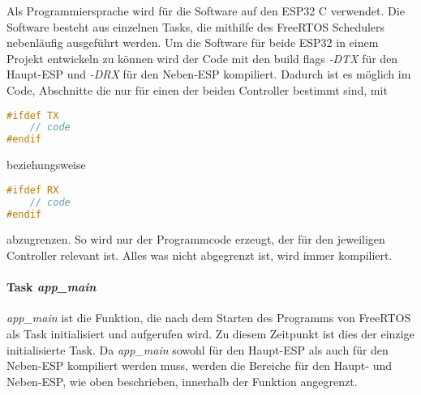 Als Programmiersprache wird für die Software auf den ESP32 C verwendet.
Die Software besteht aus einzelnen Tasks, die mithilfe des FreeRTOS Schedulers nebenläufig ausgeführt werden.
Um die Software für beide ESP32 in einem Projekt entwickeln zu können wird der Code mit den build flags \textit{-DTX} für den Haupt-ESP und \textit{-DRX} für den Neben-ESP kompiliert.
Dadurch ist es möglich im Code, Abschnitte die nur für einen der beiden Controller bestimmt sind, mit
\begin{lstlisting}[language=C, frame=none]
#ifdef TX
    // code
#endif
\end{lstlisting}
beziehungsweise
\begin{lstlisting}[language=C, frame=none]
#ifdef RX
    // code
#endif
\end{lstlisting}
abzugrenzen.
So wird nur der Programmcode erzeugt, der für den jeweiligen Controller relevant ist.
Alles was nicht abgegrenzt ist, wird immer kompiliert.

\paragraph{Task \textit{app\_main}}
\textit{app\_main} ist die Funktion, die nach dem Starten des Programms von FreeRTOS als Task initialisiert und aufgerufen wird.
Zu diesem Zeitpunkt ist dies der einzige initialisierte Task.
Da \textit{app\_main} sowohl für den Haupt-ESP als auch für den Neben-ESP kompiliert werden muss, werden die Bereiche für den Haupt- und Neben-ESP, wie oben beschrieben, innerhalb der Funktion angegrenzt.

